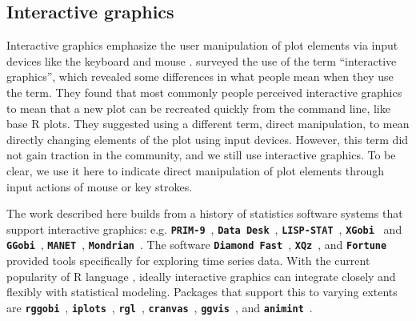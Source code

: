 \documentclass[12pt]{article}
\begin{document}

\subsection{Interactive graphics\label{sec:interactive-graphics}}

Interactive graphics emphasize the user manipulation of plot elements via input devices like the keyboard and mouse \citep{symanzik2012interactive}. \citet{swayne1999} surveyed the use of the term ``interactive graphics'', which revealed some differences in what people mean when they use the term. They found that most commonly people perceived interactive graphics to mean that a new plot can be recreated quickly from the command line, like base R plots. They suggested using a different term, direct manipulation, to mean directly changing elements of the plot using input devices. However, this term did not gain traction in the community, and we still use interactive graphics. To be clear, we use it here to indicate direct manipulation of plot elements through input actions of mouse or key strokes. 

The work described here builds from a history of statistics software systems that support interactive graphics: e.g. 
\texttt{\textbf{PRIM-9}}~\citep{fisherkeller1988prim},
\texttt{\textbf{Data Desk}}~\citep{velleman1988datadesk},
\texttt{\textbf{LISP-STAT}}~\citep{tierney1990lisp},
\texttt{\textbf{XGobi}}~\citep{swayne1998xgobi} and
\texttt{\textbf{GGobi}}~\citep{cook2007ggobi},
\texttt{\textbf{MANET}}~\citep{unwin1996manet},
\texttt{\textbf{Mondrian}}~\citep{theus2002mondrian}.
The software \texttt{\textbf{Diamond Fast}}~\citep{unwin1988eyeballing},
\texttt{\textbf{XQz}}~\citep{McDougall1994}, and \texttt{\textbf{Fortune}}~\citep{kotterfortune}  provided tools specifically for exploring time series data.
With the current popularity of R language \citep{Rlanguage}, ideally interactive graphics can
integrate closely and flexibly with statistical modeling. Packages that support this to varying extents are \texttt{\textbf{rggobi}}~\citep{rggobi},
\texttt{\textbf{iplots}}~\citep{iplots},
\texttt{\textbf{rgl}}~\citep{adler2003rgl},
\texttt{\textbf{cranvas}}~\citep{cranvas},
\texttt{\textbf{ggvis}}~\citep{ggvis},
and \texttt{\textbf{animint}}~\citep{animint}. 
\end{document}
